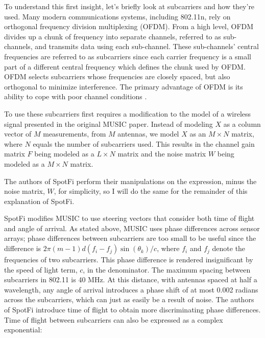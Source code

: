 \documentclass[12pt]{report}
\begin{document}
To understand this first insight, let's briefly look at subcarriers and how they're used. Many modern communications systems, including 802.11n, rely on orthogonal frequency division multiplexing (OFDM). From a high level, OFDM divides up a chunk of frequency into separate channels, referred to as sub-channels, and transmits data using each sub-channel. These sub-channels' central frequencies are referred to as subcarriers since each carrier frequency is a small part of a different central frequency which defines the chunk used by OFDM. OFDM selects subcarriers whose frequencies are closely spaced, but also orthogonal to minimize interference. The primary advantage of OFDM is its ability to cope with poor channel conditions \cite{80211MultipleAntennasDummiesHalperin2010,80211nStandard}. \par

To use these subcarriers first requires a modification to the model of a wireless signal presented in the original MUSIC paper. Instead of modeling $X$ as a column vector of $M$ measurements, from $M$ antennas, we model $X$ as an $M \times N$ matrix, where $N$ equals the number of subcarriers used. This results in the channel gain matrix $F$ being modeled as a $L \times N$ matrix and the noise matrix $W$ being modeled as a $M \times N$ matrix. \par

The authors of SpotFi perform their manipulations on the expression, minus the noise matrix, $W$, for simplicity, so I will do the same for the remainder of this explanation of SpotFi. \par

SpotFi modifies MUSIC to use steering vectors that consider both time of flight and angle of arrival. As stated above, MUSIC uses phase differences across sensor arrays; phase differences between subcarriers are too small to be useful since the difference is $2 \pi (m - 1) d (f_i - f_j) \sin(\theta_k) / c$, where $f_i$ and $f_j$ denote the frequencies of two subcarriers. This phase difference is rendered insignificant by the speed of light term, $c$, in the denominator. The maximum spacing between subcarriers in 802.11 is 40 MHz. At this distance, with antennas spaced at half a wavelength, any angle of arrival introduces a phase shift of at most 0.002 radians across the subcarriers, which can just as easily be a result of noise. The authors of SpotFi introduce time of flight to obtain more discriminating phase differences. Time of flight between subcarriers can also be expressed as a complex exponential:
\end{document}
